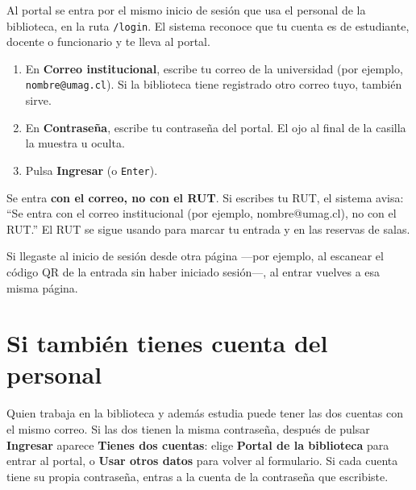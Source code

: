 \documentclass[11pt,a4paper]{report}
\begin{document}
Al portal se entra por el mismo inicio de sesión que usa el personal de la
biblioteca, en la ruta \texttt{/login}. El sistema reconoce que tu cuenta
es de estudiante, docente o funcionario y te lleva al portal.


\begin{enumerate}
  \item En \textbf{Correo institucional}, escribe tu correo de la
  universidad (por ejemplo, \texttt{nombre@umag.cl}). Si la biblioteca
  tiene registrado otro correo tuyo, también sirve.
  \item En \textbf{Contraseña}, escribe tu contraseña del portal. El ojo al
  final de la casilla la muestra u oculta.
  \item Pulsa \textbf{Ingresar} (o \texttt{Enter}).
\end{enumerate}

\begin{importante}
Se entra \textbf{con el correo, no con el RUT}. Si escribes tu RUT, el
sistema avisa: ``Se entra con el correo institucional (por ejemplo,
nombre@umag.cl), no con el RUT.'' El RUT se sigue usando para marcar tu
entrada y en las reservas de salas.
\end{importante}


Si llegaste al inicio de sesión desde otra página ---por ejemplo, al
escanear el código QR de la entrada sin haber iniciado sesión---, al entrar
vuelves a esa misma página.

\section{Si también tienes cuenta del personal}

Quien trabaja en la biblioteca y además estudia puede tener las dos cuentas
con el mismo correo. Si las dos tienen la misma contraseña, después de
pulsar \textbf{Ingresar} aparece \textbf{Tienes dos cuentas}: elige
\textbf{Portal de la biblioteca} para entrar al portal, o \textbf{Usar
otros datos} para volver al formulario. Si cada cuenta tiene su propia
contraseña, entras a la cuenta de la contraseña que escribiste.

\end{document}
